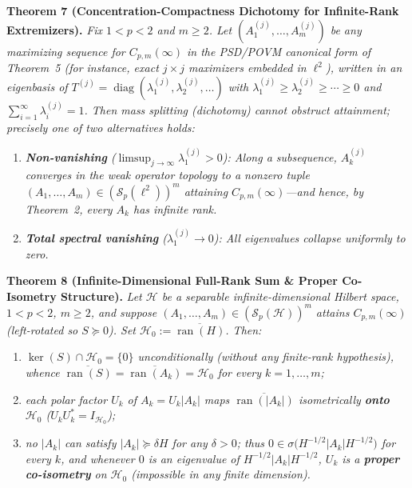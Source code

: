 \documentclass[10pt,letterpaper]{article}
\newcommand{\Hilb}{\mathcal{H}}
\newcommand{\Sp}{\mathcal{S}_p}
\newcommand{\ran}{\operatorname{ran}}
\newcommand{\diag}{\operatorname{diag}}
\begin{document}
\begin{tcolorbox}[mathbox]
\textbf{Theorem 7 (Concentration-Compactness Dichotomy for Infinite-Rank Extremizers).}
\emph{Fix $1 < p < 2$ and $m \ge 2$. Let $(A_1^{(j)},\dots,A_m^{(j)})$ be any maximizing sequence for $C_{p,m}(\infty)$ in the PSD/POVM canonical form of Theorem~5 (for instance, exact $j\times j$ maximizers embedded in $\ell^2$), written in an eigenbasis of $T^{(j)} = \diag(\lambda_1^{(j)}, \lambda_2^{(j)}, \dots)$ with $\lambda_1^{(j)} \ge \lambda_2^{(j)} \ge \cdots \ge 0$ and $\sum_{i=1}^\infty \lambda_i^{(j)} = 1$. Then mass splitting (dichotomy) cannot obstruct attainment; precisely one of two alternatives holds:}
\begin{enumerate}[leftmargin=1.6em,itemsep=2pt,topsep=2pt]
  \item \emph{\textbf{Non-vanishing} ($\limsup_{j\to\infty} \lambda_1^{(j)} > 0$): Along a subsequence, $A_k^{(j)}$ converges in the weak operator topology to a nonzero tuple $(A_1,\dots,A_m) \in (\Sp(\ell^2))^m$ attaining $C_{p,m}(\infty)$—and hence, by Theorem~2, every $A_k$ has infinite rank.}
  \item \emph{\textbf{Total spectral vanishing} ($\lambda_1^{(j)} \to 0$): All eigenvalues collapse uniformly to zero.}
\end{enumerate}
\end{tcolorbox}

\begin{tcolorbox}[mathbox]
\textbf{Theorem 8 (Infinite-Dimensional Full-Rank Sum \& Proper Co-Isometry Structure).}
\emph{Let $\Hilb$ be a separable infinite-dimensional Hilbert space, $1 < p < 2$, $m \ge 2$, and suppose $(A_1,\dots,A_m) \in (\Sp(\Hilb))^m$ attains $C_{p,m}(\infty)$ (left-rotated so $S \succeq 0$). Set $\Hilb_0 := \overline{\ran(H)}$. Then:}
\begin{enumerate}[leftmargin=1.6em,itemsep=1.5pt,topsep=2pt]
  \item \emph{$\ker(S) \cap \Hilb_0 = \{0\}$ unconditionally (without any finite-rank hypothesis), whence $\overline{\ran(S)} = \overline{\ran(A_k)} = \Hilb_0$ for every $k = 1,\dots,m$;}
  \item \emph{each polar factor $U_k$ of $A_k = U_k |A_k|$ maps $\overline{\ran(|A_k|)}$ isometrically \textbf{onto} $\Hilb_0$ ($U_k U_k^* = I_{\Hilb_0}$);}
  \item \emph{no $|A_k|$ can satisfy $|A_k| \succeq \delta H$ for any $\delta > 0$; thus $0 \in \sigma\bigl(H^{-1/2}|A_k|H^{-1/2}\bigr)$ for every $k$, and whenever $0$ is an eigenvalue of $H^{-1/2}|A_k|H^{-1/2}$, $U_k$ is a \textbf{proper co-isometry} on $\Hilb_0$ (impossible in any finite dimension).}
\end{enumerate}
\end{tcolorbox}
\end{document}
